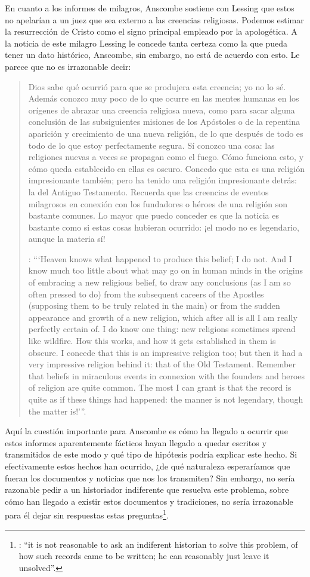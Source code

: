 En cuanto a los informes de milagros, Anscombe sostiene con Lessing que estos no apelarían a un juez que sea externo a las creencias religiosas. Podemos estimar la resurrección de Cristo como el signo principal empleado por la apologética. A la noticia de este milagro Lessing le concede tanta certeza como la que pueda tener un dato histórico, Anscombe, sin embargo, no está de acuerdo con esto. Le parece que no es irrazonable decir: \blockquote[{\Cite[26]{anscombe2008faith:prophandmi}}: \enquote{`Heaven knows what happened to produce this belief; I do not. And I know much too little about what may go on in human minds in the origins of embracing a new religious belief, to draw any conclusions (as I am so often pressed to do) from the subsequent careers of the Apostles (supposing them to be truly related in the main) or from the sudden appearance and growth of a new religion, which after all is all I am really perfectly certain of. I do know one thing: new religions sometimes spread like wildfire. How this works, and how it gets established in them is obscure. I concede that this is an impressive religion too; but then it had a very impressive religion behind it: that of the Old Testament. Remember that beliefs in miraculous events in connexion with the founders and heroes of religion are quite common. The most I can grant is that the record is quite as if these things had happened: the manner is not legendary, though the matter is!'}.]{Dios sabe qué ocurrió para que se produjera esta creencia; yo no lo sé. Además conozco muy poco de lo que ocurre en las mentes humanas en los orígenes de abrazar una creencia religiosa nueva, como para sacar alguna conclusión \textelp{} de las subsiguientes misiones de los Apóstoles \textelp{} o de la repentina aparición y crecimiento de una nueva religión, de lo que después de todo es todo de lo que estoy perfectamente segura. Sí conozco una cosa: las religiones nuevas a veces se propagan como el fuego. Cómo funciona esto, y cómo queda establecido en ellas es oscuro. Concedo que esta es una religión impresionante también; pero ha tenido una religión impresionante detrás: la del Antiguo Testamento. Recuerda que las creencias de eventos milagrosos en conexión con los fundadores o héroes de una religión son bastante comunes. Lo mayor que puedo conceder es que la noticia es bastante como si estas cosas hubieran ocurrido: ¡el modo no es legendario, aunque la materia sí!}

Aquí la cuestión importante para Anscombe es cómo ha llegado a ocurrir que estos informes aparentemente fácticos hayan llegado a quedar escritos y transmitidos de este modo y qué tipo de hipótesis podría explicar este hecho. Si efectivamente estos hechos han ocurrido, ¿de qué naturaleza esperaríamos que fueran los documentos y noticias que nos los transmiten? Sin embargo, no sería razonable pedir a un historiador indiferente que resuelva este problema, sobre cómo han llegado a existir estos documentos y tradiciones, no sería irrazonable para él dejar sin respuestas estas preguntas\footnote{\cite[Cf.][37]{anscombe2008faith:prophandmi}: \enquote{it is not reasonable to ask an indiferent historian to solve this problem, of how such records came to be written; he can reasonably just leave it unsolved}.}.

